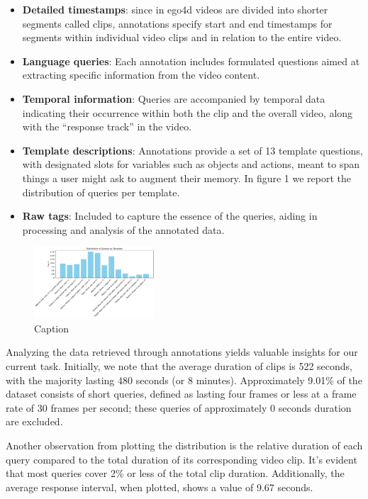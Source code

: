 \documentclass[conference]{IEEEtran}
\begin{document}
\begin{itemize}
    \item \textbf{Detailed timestamps}: since in ego4d videos are divided into shorter segments called clips, annotations specify start and end timestamps for segments within individual video clips and in relation to the entire video.
    \item \textbf{Language queries}: Each annotation includes formulated questions aimed at extracting specific information from the video content.
    \item \textbf{Temporal information}: Queries are accompanied by temporal data indicating their occurrence within both the clip and the overall video, along with the “response track” in the video.
    \item \textbf{Template descriptions}: Annotations provide a set of 13 template questions, with designated slots for variables such as objects and actions, meant to span things a user might ask to augment their memory. In figure 1 we report the distribution of queries per template.
    \item \textbf{Raw tags}: Included to capture the essence of the queries, aiding in processing and analysis of the annotated data.
\end{itemize}

\begin{figure}[h]
\includegraphics[width=0.4\textwidth]{Figure1.pdf} %
\caption{Caption}
\label{fig:figure2}
\end{figure}

Analyzing the data retrieved through annotations yields valuable insights for our current task. Initially, we note that the average duration of clips is 522 seconds, with the majority lasting 480 seconds (or 8 minutes). Approximately 9.01\% of the dataset consists of short queries, defined as lasting four frames or less at a frame rate of 30 frames per second; these queries of approximately 0 seconds duration are excluded.

Another observation from plotting the distribution is the relative duration of each query compared to the total duration of its corresponding video clip. It's evident that most queries cover 2\% or less of the total clip duration. Additionally, the average response interval, when plotted, shows a value of 9.67 seconds.
\end{document}
